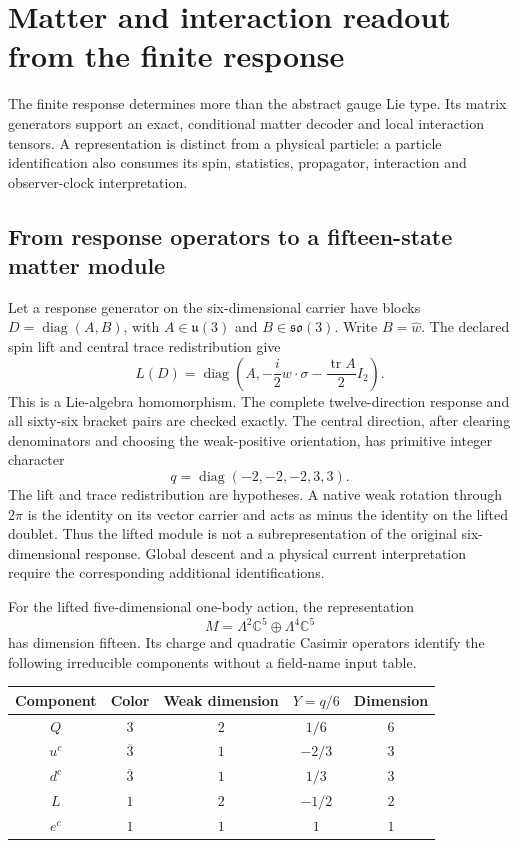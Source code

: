 \section{Matter and interaction readout from the finite response}
\label{sec:repair-matter-readout}

The finite response determines more than the abstract gauge Lie type. Its
matrix generators support an exact, conditional matter decoder and local
interaction tensors. A representation is distinct from a physical particle:
a particle identification also consumes its spin, statistics, propagator,
interaction and observer-clock interpretation.

\subsection{From response operators to a fifteen-state matter module}

Let a response generator on the six-dimensional carrier have blocks
\(D=\operatorname{diag}(A,B)\), with \(A\in\mathfrak u(3)\) and
\(B\in\mathfrak{so}(3)\). Write \(B=\widehat w\). The declared spin lift and
central trace redistribution give
\[
 L(D)=\operatorname{diag}\left(
 A,-\frac{i}{2}w\cdot\sigma-\frac{\operatorname{tr}A}{2}I_2\right).
\]
This is a Lie-algebra homomorphism. The complete twelve-direction response
and all sixty-six bracket pairs are checked exactly. The central direction,
after clearing denominators and choosing the weak-positive orientation, has
primitive integer character
\[
 q=\operatorname{diag}(-2,-2,-2,3,3).
\]
The lift and trace redistribution are hypotheses. A native weak rotation
through \(2\pi\) is the identity on its vector carrier and acts as minus the
identity on the lifted doublet. Thus the lifted module is not a
subrepresentation of the original six-dimensional response. Global descent
and a physical current interpretation require the corresponding additional
identifications.

\begin{proposition}
For the lifted five-dimensional one-body action, the representation
\[
 M=\Lambda^2\mathbb C^5\oplus\Lambda^4\mathbb C^5
\]
has dimension fifteen. Its charge and quadratic Casimir operators identify
the following irreducible components without a field-name input table.
\end{proposition}

\begin{center}
\begin{tabular}{ccccc}
\toprule
Component & Color & Weak dimension & \(Y=q/6\) & Dimension\\
\midrule
\(Q\) & \(3\) & \(2\) & \(1/6\) & \(6\)\\
\(u^c\) & \(\overline3\) & \(1\) & \(-2/3\) & \(3\)\\
\(d^c\) & \(\overline3\) & \(1\) & \(1/3\) & \(3\)\\
\(L\) & \(1\) & \(2\) & \(-1/2\) & \(2\)\\
\(e^c\) & \(1\) & \(1\) & \(1\) & \(1\)\\
\bottomrule
\end{tabular}
\end{center}

